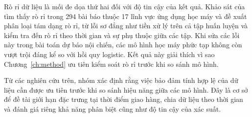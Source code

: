 \documentclass[12pt,a4paper]{report}
\begin{document}
Rò rỉ dữ liệu là mối đe dọa thứ hai đối với độ tin cậy của kết quả. Khảo sát của \textcite{kapoor2023} tìm thấy rò rỉ trong 294 bài báo thuộc 17 lĩnh vực ứng dụng học máy và đề xuất phân loại tám dạng rò rỉ, từ lỗi sơ đẳng như tiền xử lý trên cả tập huấn luyện và kiểm tra đến rò rỉ theo thời gian và sự phụ thuộc giữa các tập. Khi sửa các lỗi này trong bài toán dự báo nội chiến, các mô hình học máy phức tạp không còn vượt trội đáng kể so với hồi quy logistic. Kết quả này giải thích vì sao Chương~\ref{ch:method} ưu tiên kiểm soát rò rỉ trước khi so sánh mô hình.

Từ các nghiên cứu trên, nhóm xác định rằng việc bảo đảm tính hợp lệ của dữ liệu cần được ưu tiên trước khi so sánh hiệu năng giữa các mô hình. Đây là cơ sở để đề tài giới hạn đặc trưng tại thời điểm giao hàng, chia dữ liệu theo thời gian và đánh giá riêng khả năng phân biệt cũng như độ tin cậy của xác suất.
\end{document}
